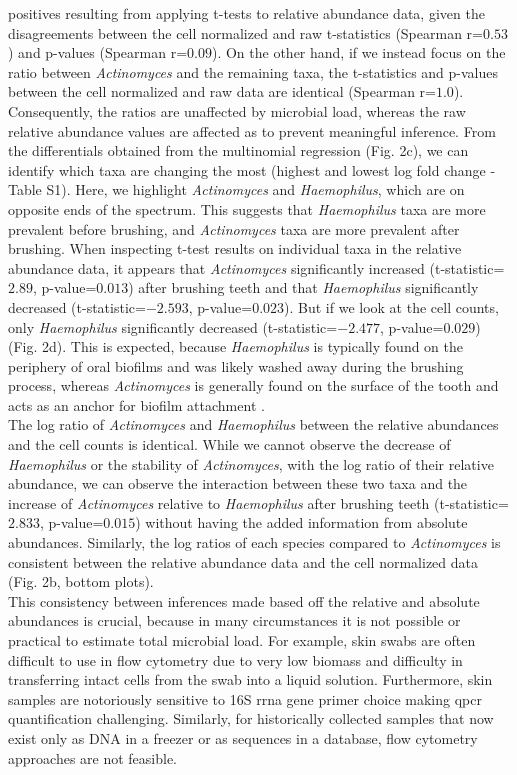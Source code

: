 positives resulting from applying t-tests to relative abundance data, given the disagreements between the
cell normalized and raw t-statistics (Spearman r=$0.53$) and p-values (Spearman r=$0.09$).  On the other
hand, if we instead focus on the ratio between \textit{Actinomyces} and the remaining taxa, the t-statistics and
p-values between the cell normalized and raw data are identical (Spearman r=$1.0$). Consequently, the
ratios are unaffected by microbial load, whereas the raw relative abundance values are affected as to
prevent meaningful inference.
%
From the differentials obtained from the multinomial regression (Fig. 2c), we can identify which taxa are
changing the most (highest and lowest log fold change - Table S1). Here, we highlight \textit{Actinomyces} and
\textit{Haemophilus}, which are on opposite ends of the spectrum. This suggests that \textit{Haemophilus} taxa are more prevalent
before brushing, and \textit{Actinomyces} taxa are more prevalent after brushing. When inspecting t-test results on
individual taxa in the relative abundance data, it appears that \textit{Actinomyces} significantly increased
(t-statistic=$2.89$, p-value=$0.013$) after brushing teeth and that \textit{Haemophilus} significantly decreased
(t-statistic=$-2.593$, p-value=$0.023$). But if we look at the cell counts, only \textit{Haemophilus} significantly
decreased (t-statistic=$-2.477$, p-value=$0.029$) (Fig. 2d). This is expected, because \textit{Haemophilus} is
typically found on the periphery of oral biofilms and was likely washed away during the brushing process,
whereas \textit{Actinomyces} is generally found on the surface of the tooth and acts as an anchor for biofilm
attachment \cite{Welch2016-lw}. \\[5 mm]
%
The log ratio of \textit{Actinomyces} and \textit{Haemophilus} between the relative abundances and the cell counts is identical.
While we cannot observe the decrease of \textit{Haemophilus} or the stability of \textit{Actinomyces}, with the log ratio of their
relative abundance, we can observe the interaction between these two taxa and the increase of \textit{Actinomyces}
relative to \textit{Haemophilus} after brushing teeth (t-statistic=$2.833$, p-value=$0.015$) without having the added
information from absolute abundances. Similarly, the log ratios of each species compared to \textit{Actinomyces} is
consistent between the relative abundance data and the cell normalized data (Fig. 2b, bottom plots).\\[5 mm]
%
This consistency between inferences made based off the relative and absolute abundances is crucial, because
in many circumstances it is not possible or practical to estimate total microbial load. For example, skin swabs
are often difficult to use in flow cytometry due to very low biomass and difficulty in transferring intact cells
from the swab into a liquid solution. Furthermore, skin samples are notoriously sensitive to 16S \gls{rrna} gene primer
choice making \gls{qpcr} quantification challenging. Similarly, for historically collected samples that now exist only
as DNA in a freezer or as sequences in a database, flow cytometry approaches are not feasible. \\[5 mm]
%
